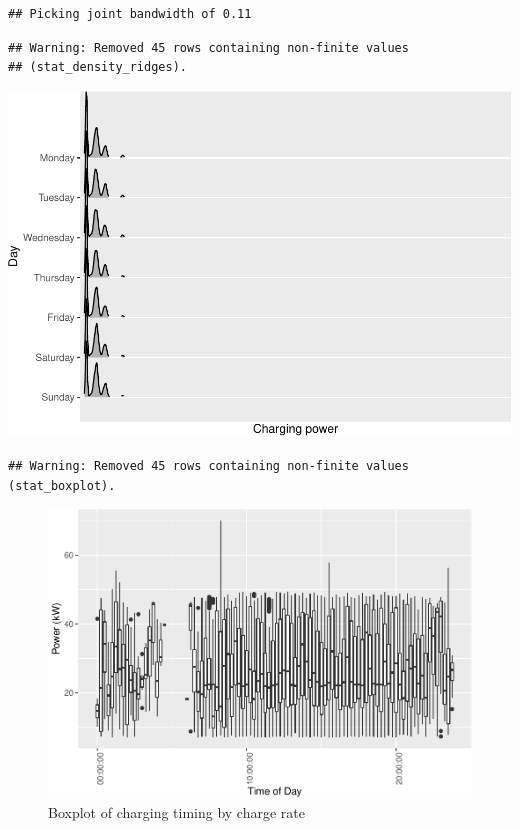 \documentclass[]{article}
\begin{document}
\begin{verbatim}
## Picking joint bandwidth of 0.11
\end{verbatim}

\begin{verbatim}
## Warning: Removed 45 rows containing non-finite values
## (stat_density_ridges).
\end{verbatim}

\includegraphics{EVBB_report_files/figure-latex/joyplot-1.pdf}

\begin{verbatim}
## Warning: Removed 45 rows containing non-finite values (stat_boxplot).
\end{verbatim}

\begin{figure}
\centering
\includegraphics{EVBB_report_files/figure-latex/plot3-1.pdf}
\caption{\label{fig:plot3}Boxplot of charging timing by charge rate}
\end{figure}
\end{document}
